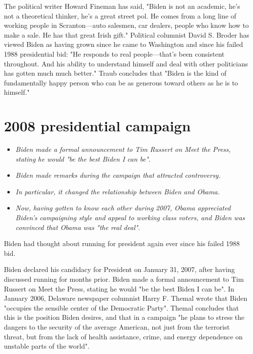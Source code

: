 The political writer Howard Fineman has said, "Biden is not an academic,
he's not a theoretical thinker, he's a great street pol. He comes from a
long line of working people in Scranton---auto salesmen, car dealers,
people who know how to make a sale. He has that great Irish gift."
Political columnist David S. Broder has viewed Biden as having grown
since he came to Washington and since his failed 1988 presidential bid:
"He responds to real people---that's been consistent throughout. And his
ability to understand himself and deal with other politicians has gotten
much much better." Traub concludes that "Biden is the kind of
fundamentally happy person who can be as generous toward others as he is
to himself."

\section{2008 presidential campaign}\label{presidential-campaign-1}

\begin{itemize}
\item
  \emph{Biden made a formal announcement to Tim Russert on Meet the
  Press, stating he would "be the best Biden I can be".}
\item
  \emph{Biden made remarks during the campaign that attracted
  controversy.}
\item
  \emph{In particular, it changed the relationship between Biden and
  Obama.}
\item
  \emph{Now, having gotten to know each other during 2007, Obama
  appreciated Biden's campaigning style and appeal to working class
  voters, and Biden was convinced that Obama was "the real deal".}
\end{itemize}

Biden had thought about running for president again ever since his
failed 1988 bid.

Biden declared his candidacy for President on January 31, 2007, after
having discussed running for months prior. Biden made a formal
announcement to Tim Russert on Meet the Press, stating he would "be the
best Biden I can be". In January 2006, Delaware newspaper columnist
Harry F. Themal wrote that Biden "occupies the sensible center of the
Democratic Party". Themal concludes that this is the position Biden
desires, and that in a campaign "he plans to stress the dangers to the
security of the average American, not just from the terrorist threat,
but from the lack of health assistance, crime, and energy dependence on
unstable parts of the world".

